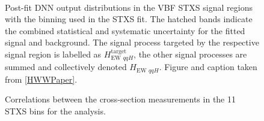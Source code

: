\begin{figure}[!h]
  \centering
   \\
  \caption{
    Post-fit DNN output distributions in the VBF STXS signal regions with the binning used in the STXS fit.
    The hatched bands indicate the combined statistical and systematic uncertainty for the fitted signal and background.
    The signal process targeted by the respective signal region is labelled as $H_{\text{EW } qqH}^{\mathrm{target}}$, the other signal processes are summed and collectively denoted $H_{\text{EW } qqH}$. 
    Figure and caption taken from \cref{HWWPaper}. 
    \label{fig:aux:VBF-STXS-SRs}
  }
\end{figure}


\begin{figure}[htb]
  \centering
  \scalebox{0.9}{
    
  }
  \caption{
    Correlations between the cross-section measurements in the 11 STXS bins for the \hwwenmn analysis.
    \label{fig:STXS-correlation}
  }
\end{figure}


